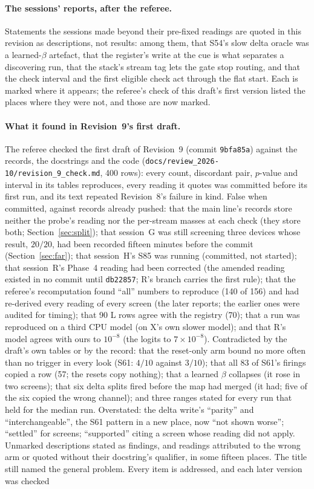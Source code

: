 \documentclass[11pt]{article}
\begin{document}
\paragraph{The sessions' reports, after the referee.} Statements the sessions made beyond their pre-fixed readings are quoted in this revision as descriptions, not results: among them, that S54's slow delta oracle was a learned-$\beta$ artefact, that the register's write at the cue is what separates a discovering run, that the stack's stream tag lets the gate stop routing, and that the check interval and the first eligible check act through the flat start. Each is marked where it appears; the referee's check of this draft's first version listed the places where they were not, and those are now marked.

\paragraph{What it found in Revision~9's first draft.} The referee checked the first draft of Revision~9 (commit \texttt{9bfa85a}) against the records, the docstrings and the code (\texttt{docs/review\_2026-10/revision\_9\_check.md}, 400 rows): every count, discordant pair, $p$-value and interval in its tables reproduces, every reading it quotes was committed before its first run, and its text repeated Revision~8's failure in kind. False when committed, against records already pushed: that the main line's records store neither the probe's reading nor the per-stream masses at each check (they store both; Section~\ref{sec:split}); that session~G was still screening three devices whose result, $20/20$, had been recorded fifteen minutes before the commit (Section~\ref{sec:far}); that session~H's S85 was running (committed, not started); that session~R's Phase~4 reading had been corrected (the amended reading existed in no commit until \texttt{db22857}; R's branch carries the first rule); that the referee's recomputation found ``all'' numbers to reproduce (140 of 156) and had re-derived every reading of every screen (the later reports; the earlier ones were audited for timing); that 90 L rows agree with the registry (70); that a run was reproduced on a third CPU model (on X's own slower model); and that R's model agrees with ours to $10^{-8}$ (the logits to $7\times10^{-8}$). Contradicted by the draft's own tables or by the record: that the reset-only arm bound no more often than no trigger in every look (S61: $4/10$ against $3/10$); that all 83 of S61's firings copied a row (57; the resets copy nothing); that a learned $\beta$ collapses (it rose in two screens); that six delta splits fired before the map had merged (it had; five of the six copied the wrong channel); and three ranges stated for every run that held for the median run. Overstated: the delta write's ``parity'' and ``interchangeable'', the S61 pattern in a new place, now ``not shown worse''; ``settled'' for screens; ``supported'' citing a screen whose reading did not apply. Unmarked descriptions stated as findings, and readings attributed to the wrong arm or quoted without their docstring's qualifier, in some fifteen places. The title still named the general problem. Every item is addressed, and each later version was checked 
\end{document}
